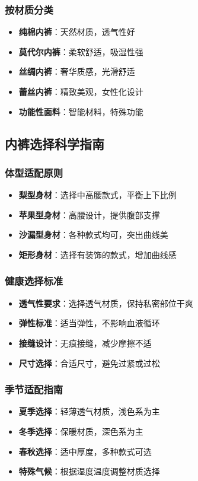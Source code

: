 \documentclass[12pt,UTF8]{ctexbook}
\begin{document}
\subsubsection{按材质分类}
\begin{itemize}[leftmargin=2cm]
	\item \textbf{纯棉内裤}：天然材质，透气性好
	\item \textbf{莫代尔内裤}：柔软舒适，吸湿性强
	\item \textbf{丝绸内裤}：奢华质感，光滑舒适
	\item \textbf{蕾丝内裤}：精致美观，女性化设计
	\item \textbf{功能性面料}：智能材料，特殊功能
\end{itemize}

\subsection{内裤选择科学指南}
\subsubsection{体型适配原则}
\begin{itemize}[leftmargin=2cm]
	\item \textbf{梨型身材}：选择中高腰款式，平衡上下比例
	\item \textbf{苹果型身材}：高腰设计，提供腹部支撑
	\item \textbf{沙漏型身材}：各种款式均可，突出曲线美
	\item \textbf{矩形身材}：选择有装饰的款式，增加曲线感
\end{itemize}

\subsubsection{健康选择标准}
\begin{itemize}[leftmargin=2cm]
	\item \textbf{透气性要求}：选择透气材质，保持私密部位干爽
	\item \textbf{弹性标准}：适当弹性，不影响血液循环
	\item \textbf{接缝设计}：无痕接缝，减少摩擦不适
	\item \textbf{尺寸选择}：合适尺寸，避免过紧或过松
\end{itemize}

\subsubsection{季节适配指南}
\begin{itemize}[leftmargin=2cm]
	\item \textbf{夏季选择}：轻薄透气材质，浅色系为主
	\item \textbf{冬季选择}：保暖材质，深色系为主
	\item \textbf{春秋选择}：适中厚度，多种款式可选
	\item \textbf{特殊气候}：根据湿度温度调整材质选择
\end{itemize}
\end{document}

